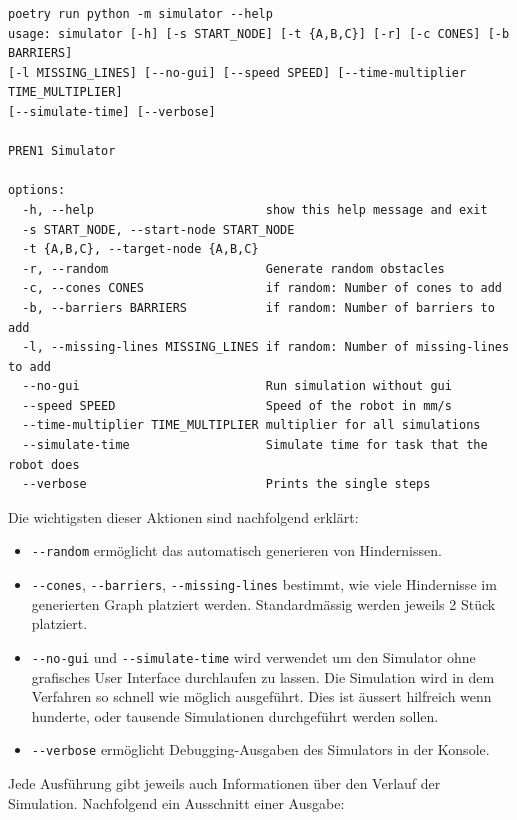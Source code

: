 \begin{footnotesize}
\begin{verbatim}
poetry run python -m simulator --help
usage: simulator [-h] [-s START_NODE] [-t {A,B,C}] [-r] [-c CONES] [-b BARRIERS] 
[-l MISSING_LINES] [--no-gui] [--speed SPEED] [--time-multiplier TIME_MULTIPLIER] 
[--simulate-time] [--verbose]

PREN1 Simulator

options:
  -h, --help                        show this help message and exit
  -s START_NODE, --start-node START_NODE
  -t {A,B,C}, --target-node {A,B,C}
  -r, --random                      Generate random obstacles
  -c, --cones CONES                 if random: Number of cones to add
  -b, --barriers BARRIERS           if random: Number of barriers to add
  -l, --missing-lines MISSING_LINES if random: Number of missing-lines to add
  --no-gui                          Run simulation without gui
  --speed SPEED                     Speed of the robot in mm/s
  --time-multiplier TIME_MULTIPLIER multiplier for all simulations
  --simulate-time                   Simulate time for task that the robot does
  --verbose                         Prints the single steps
\end{verbatim}
\end{footnotesize}

Die wichtigsten dieser Aktionen sind nachfolgend erklärt:

\begin{itemize}
    \item \verb|--random| ermöglicht das automatisch generieren von Hindernissen.
    \item \verb|--cones|, \verb|--barriers|, \verb|--missing-lines| bestimmt, wie viele Hindernisse im generierten Graph platziert werden. Standardmässig werden jeweils 2 Stück platziert.
    \item \verb|--no-gui| und \verb|--simulate-time| wird verwendet um den Simulator ohne grafisches User Interface durchlaufen zu lassen. Die Simulation wird in dem Verfahren so schnell wie möglich ausgeführt. Dies ist äussert hilfreich wenn hunderte, oder tausende Simulationen durchgeführt werden sollen.
    \item \verb|--verbose| ermöglicht Debugging-Ausgaben des Simulators in der Konsole.
\end{itemize}

Jede Ausführung gibt jeweils auch Informationen über den Verlauf der Simulation. Nachfolgend ein Ausschnitt einer Ausgabe:

